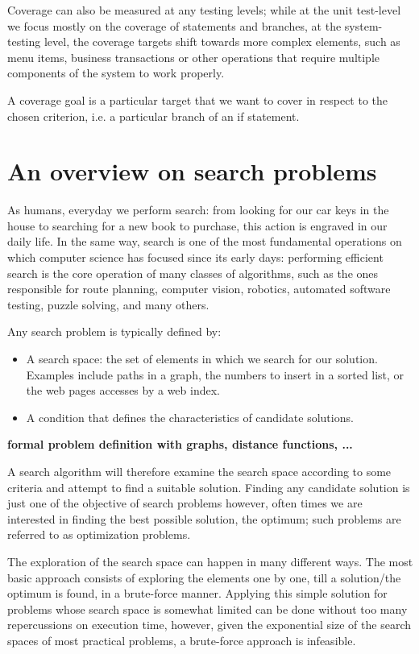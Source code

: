 Coverage can also be measured at any testing levels; while at the unit test-level we focus mostly on the coverage of statements and branches, at the system-testing level, the coverage targets shift towards more complex elements, such as menu items, business transactions or other operations that require multiple components of the system to work properly.

A coverage goal is a particular target that we want to cover in respect to the chosen criterion, i.e. a particular branch of an if statement.


\section{An overview on search problems}
As humans, everyday we perform search: from looking for our car keys in the house to searching for a new book to purchase, this action is engraved in our daily life.
In the same way, search is one of the most fundamental operations on which computer science has focused since its early days: performing efficient search is the core operation of many classes of algorithms, such as the ones responsible for route planning, computer vision, robotics, automated software testing, puzzle solving, and many others.


Any search problem is typically defined by: 
\begin{itemize}
    \item A search space: the set of elements in which we search for our solution. Examples include paths in a graph, the numbers to insert in a sorted list, or the web pages accesses by a web index.
    \item A condition that defines the characteristics of candidate solutions.
\end{itemize}

\textbf{formal problem definition with graphs, distance functions, ...}

A search algorithm will therefore examine the search space according to some criteria and attempt to find a suitable solution. Finding any candidate solution is just one of the objective of search problems however, often times we are interested in finding the best possible solution, the optimum; such problems are referred to as optimization problems.

The exploration of the search space can happen in many different ways. The most basic approach consists of exploring the elements one by one, till a solution/the optimum is found, in a brute-force manner. Applying this simple solution for problems whose search space is somewhat limited can be done without too many repercussions on execution time, however, given the exponential size of the search spaces of most practical problems, a brute-force approach is infeasible. 

